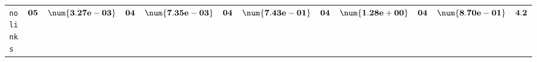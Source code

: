 \begin{xltabular}{\textwidth}{l||cC|cC|cC|cC|cC||c}
	\texttt{no links} & $\bf 05$ & $\bf \num{3.27e-03}$ & $\bf 04$ & $\bf \num{7.35e-03}$ & $\bf 04$ & $\bf \num{7.43e-01}$ & $\bf 04$ & $\bf \num{1.28e+00}$ & $\bf 04$ & $\bf \num{8.70e-01}$ & $\bf 4.2$  \\
\end{xltabular}
